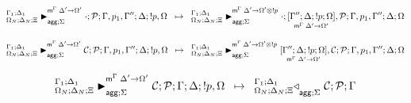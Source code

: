 

\[
\trans{
   \matstatea{\Delta_N}{\cdot;
      \lstack{P}}{\Gamma, p_1, \Gamma''}{\Delta}{\bang p, \Omega}{\Delta' \rightarrow
         \Omega'}{\Sigma}
}
{
   \matstatea{\Delta_N}{\cdot; \pframe{\Gamma''}{\Delta}{\bang
   p}{\Omega}{\Delta'}{\Omega'}, \lstack{P}}{\Gamma, p_1, \Gamma''}{\Delta}{\Omega}
   {\Delta' \rightarrow \Omega' \otimes \bang p}{\Sigma}
}
\]

\[
\trans{
   \matstatea{\Delta_N}{\lstack{C};
      \lstack{P}}{\Gamma, p_1, \Gamma''}{\Delta}{\bang p, \Omega}{\Delta' \rightarrow
         \Omega'}{\Sigma}
}
{
   \matstatea{\Delta_N}{\pframe{\Gamma''}{\Delta}{\bang
   p}{\Omega}{\Delta'}{\Omega'}, \lstack{C} ; \lstack{P}}{\Gamma, p_1, \Gamma''}{\Delta}{\Omega}
   {\Delta' \rightarrow \Omega' \otimes \bang p}{\Sigma}
}
\]


\[
\trans{
   \matstatea{\Delta_N}{\lstack{C}; \lstack{P}}{\Gamma}{\Delta}{\bang p,
      \Omega}{\Delta' \rightarrow \Omega'}{\Sigma}
}
{
   \contstatea{\Delta_N}{\lstack{C} ; \lstack{P}}{\Gamma}{\Sigma}
}
\]


